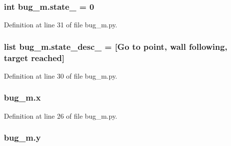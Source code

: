 \subsubsection[{\texorpdfstring{state\+\_\+}{state_}}]{\setlength{\rightskip}{0pt plus 5cm}int bug\+\_\+m.\+state\+\_\+ = 0}\hypertarget{namespacebug__m_a79dc362dff5bef439beacdd5c0c3b2f1}{}\label{namespacebug__m_a79dc362dff5bef439beacdd5c0c3b2f1}


Definition at line 31 of file bug\+\_\+m.\+py.

\subsubsection[{\texorpdfstring{state\+\_\+desc\+\_\+}{state_desc_}}]{\setlength{\rightskip}{0pt plus 5cm}list bug\+\_\+m.\+state\+\_\+desc\+\_\+ = \mbox{[}\textquotesingle{}Go to point\textquotesingle{}, \textquotesingle{}wall following\textquotesingle{}, \textquotesingle{}target reached\textquotesingle{}\mbox{]}}\hypertarget{namespacebug__m_ae70f71d3816862f72790fae7bfaa543b}{}\label{namespacebug__m_ae70f71d3816862f72790fae7bfaa543b}


Definition at line 30 of file bug\+\_\+m.\+py.

\subsubsection[{\texorpdfstring{x}{x}}]{\setlength{\rightskip}{0pt plus 5cm}bug\+\_\+m.\+x}\hypertarget{namespacebug__m_af10f89c7f929c9babce108f5d7382996}{}\label{namespacebug__m_af10f89c7f929c9babce108f5d7382996}


Definition at line 26 of file bug\+\_\+m.\+py.

\subsubsection[{\texorpdfstring{y}{y}}]{\setlength{\rightskip}{0pt plus 5cm}bug\+\_\+m.\+y}\hypertarget{namespacebug__m_ab8596d2ae799585b0d89152b55891aa8}{}\label{namespacebug__m_ab8596d2ae799585b0d89152b55891aa8}


